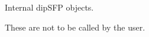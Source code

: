 \begin{Description}\relax
Internal dipSFP objects.
\end{Description}
\begin{Details}\relax
These are not to be called by the user.
\end{Details}

